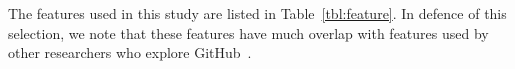 \documentclass[sigconf,review,anonymous]{acmart}
\newcommand{\tbl}[1]{Table~\ref{tbl:#1}}
\begin{document}
The features used in this study 
are listed in  \tbl{feature}.
In defence of this selection, we note that these features have much overlap with features used by other researchers who explore 
GitHub~\cite{coelho2020github, yu2016reviewer, han2019characterization}.  







 
 





\end{document}

